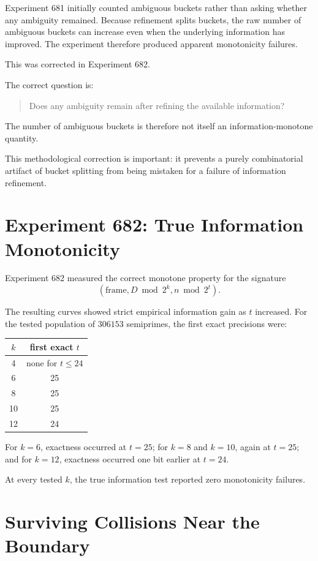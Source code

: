 \documentclass[11pt,a4paper]{article}
\begin{document}
Experiment 681 initially counted ambiguous buckets rather than asking whether any ambiguity remained.  Because refinement splits buckets, the raw number of ambiguous buckets can increase even when the underlying information has improved.  The experiment therefore produced apparent monotonicity failures.

This was corrected in Experiment 682.

The correct question is:
\begin{quote}
Does any ambiguity remain after refining the available information?
\end{quote}

The number of ambiguous buckets is therefore not itself an information-monotone quantity.

This methodological correction is important: it prevents a purely combinatorial artifact of bucket splitting from being mistaken for a failure of information refinement.

\section{Experiment 682: True Information Monotonicity}

Experiment 682 measured the correct monotone property for the signature
\[
(\text{frame},D\bmod2^k,n\bmod2^t).
\]

The resulting curves showed strict empirical information gain as $t$ increased.  For the tested population of $306153$ semiprimes, the first exact precisions were:
\begin{center}
\begin{tabular}{c c}
\toprule
$k$ & first exact $t$ \\
\midrule
4  & none for $t\le24$ \\
6  & 25 \\
8  & 25 \\
10 & 25 \\
12 & 24 \\
\bottomrule
\end{tabular}
\end{center}

For $k=6$, exactness occurred at $t=25$; for $k=8$ and $k=10$, again at $t=25$; and for $k=12$, exactness occurred one bit earlier at $t=24$.

At every tested $k$, the true information test reported zero monotonicity failures.

\section{Surviving Collisions Near the Boundary}
\end{document}
